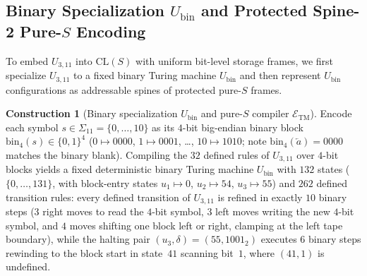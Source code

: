 \documentclass[11pt,reqno]{amsart}
\numberwithin{equation}{section}
\theoremstyle{plain}
\theoremstyle{definition}
\newtheorem{construction}[theorem]{Construction}
\theoremstyle{remark}
\newcommand{\CLS}{\mathrm{CL}(S)}
\begin{document}
\subsection{Binary Specialization \texorpdfstring{$U_{\mathrm{bin}}$}{U\_bin} and Protected Spine-2 Pure-\texorpdfstring{$S$}{S} Encoding}\label{subsec:ubin-s-encode}

To embed $U_{3,11}$ into $\CLS$ with uniform bit-level storage frames, we first specialize $U_{3,11}$ to a fixed binary Turing machine $U_{\mathrm{bin}}$ and then represent $U_{\mathrm{bin}}$ configurations as addressable spines of protected pure-$S$ frames.

\begin{construction}[Binary specialization $U_{\mathrm{bin}}$ and pure-$S$ compiler $\mathcal{E}_{\mathrm{TM}}$]\label{con:s-encode-tm}
Encode each symbol $s \in \Sigma_{11} = \{0,\dots,10\}$ as its $4$-bit big-endian binary block $\mathrm{bin}_4(s) \in \{0,1\}^4$ ($0 \mapsto 0000$, $1 \mapsto 0001$, \dots, $10 \mapsto 1010$; note $\mathrm{bin}_4(\overleftarrow{a}) = 0000$ matches the binary blank). Compiling the $32$ defined rules of $U_{3,11}$ over $4$-bit blocks yields a fixed deterministic binary Turing machine $U_{\mathrm{bin}}$ with $132$ states ($\{0,\dots,131\}$, with block-entry states $u_1 \mapsto 0$, $u_2 \mapsto 54$, $u_3 \mapsto 55$) and $262$ defined transition rules: every defined transition of $U_{3,11}$ is refined in exactly $10$ binary steps ($3$ right moves to read the $4$-bit symbol, $3$ left moves writing the new $4$-bit symbol, and $4$ moves shifting one block left or right, clamping at the left tape boundary), while the halting pair $(u_3, \delta) = (55, 1001_2)$ executes $6$ binary steps rewinding to the block start in state~$41$ scanning bit~$1$, where $(41, 1)$ is undefined.


\end{construction}
\end{document}
